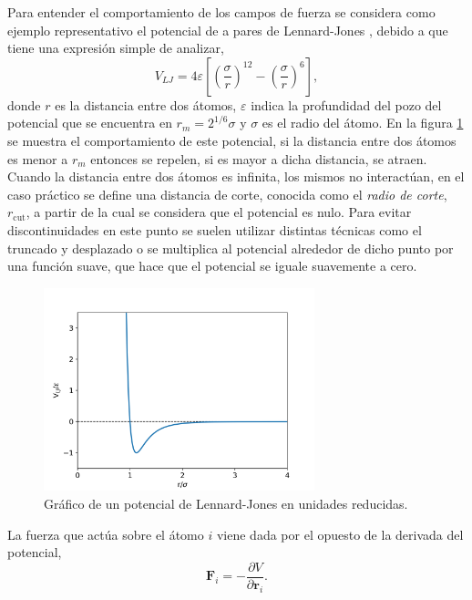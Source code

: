 Para entender el comportamiento de los campos de fuerza se considera como ejemplo 
representativo el potencial de a pares de Lennard-Jones \cite{lennard-jones}, 
debido a que tiene una expresión simple de analizar,
\begin{equation}
    V_{LJ} = 4\varepsilon \left[ \left( \frac{\sigma}{r} \right)^{12} - \left( \frac{\sigma}{r} \right)^{6} \right],
\end{equation}
donde $r$ es la distancia entre dos átomos, $\varepsilon$ indica la profundidad 
del pozo del potencial que se encuentra en $r_m = 2^{1/6} \sigma$ y $\sigma$ es el
radio del átomo. En la figura \ref{fig:lj} se muestra el comportamiento de este
potencial, si la distancia entre dos átomos es menor a $r_m$ entonces se repelen,
si es mayor a dicha distancia, se atraen. Cuando la distancia entre dos átomos es 
infinita, los mismos no interactúan, en el caso práctico se define una distancia 
de corte, conocida como el \textit{radio de corte}, $r_{\text{cut}}$, a partir de 
la cual se considera que el potencial es nulo. Para evitar discontinuidades en 
este punto se suelen utilizar distintas técnicas como el truncado y desplazado o 
se multiplica al potencial alrededor de dicho punto por una función suave, que 
hace que el potencial se iguale suavemente a cero.
\begin{figure}
    \centering
    \includegraphics[width=0.7\textwidth]{Metodos/MD/lj.png}
    \caption{Gráfico de un potencial de Lennard-Jones en unidades reducidas.}
    \label{fig:lj}
\end{figure}

La fuerza que actúa sobre el átomo $i$ viene dada por el opuesto de la derivada 
del potencial,
\begin{equation}\label{eq:fuerzas}
    \mathbf{F}_i = - \frac{\partial V}{\partial \mathbf{r}_i}.
\end{equation}

